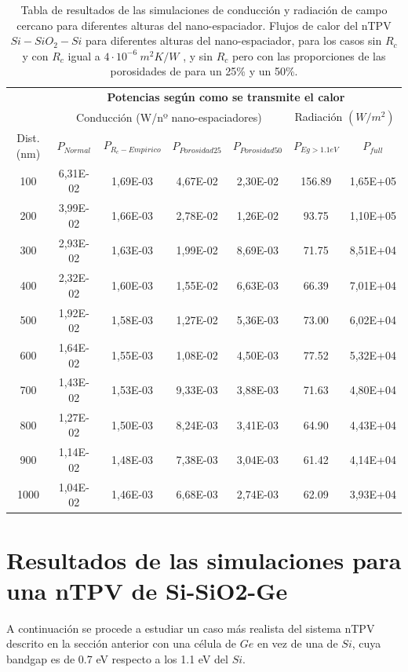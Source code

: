 \begin{table}[H]
	\centering
		\begin{tabular}{|c||c|c|c|c||c|c|}
		\hline
			\multirow{2}{*}{ }& \multicolumn{6}{c|}{\textbf{\large Potencias según como se transmite el calor}}\\ \cline{2-7}
		  & \multicolumn{4}{c||}{Conducción (W/nº nano-espaciadores)}& \multicolumn{2}{c|}{Radiación $(W/m^2)$}\\ \hline
			Dist. (nm)&$P_{Normal}$&$P_{R_c-Empirico}$&$P_{Porosidad25}$&$P_{Porosidad50}$&$P_{Eg>1.1eV}$&$P_{full}$\\ \hline \hline
			100&6,31E-02&1,69E-03&4,67E-02&2,30E-02&156.89&1,65E+05\\ \hline
			200&3,99E-02&1,66E-03&2,78E-02&1,26E-02&93.75&1,10E+05\\ \hline
			300&2,93E-02&1,63E-03&1,99E-02&8,69E-03&71.75&8,51E+04\\ \hline
			400&2,32E-02&1,60E-03&1,55E-02&6,63E-03&66.39&7,01E+04\\ \hline
			500&1,92E-02&1,58E-03&1,27E-02&5,36E-03&73.00&6,02E+04\\ \hline
			600&1,64E-02&1,55E-03&1,08E-02&4,50E-03&77.52&5,32E+04\\ \hline
			700&1,43E-02&1,53E-03&9,33E-03&3,88E-03&71.63&4,80E+04\\ \hline
			800&1,27E-02&1,50E-03&8,24E-03&3,41E-03&64.90&4,43E+04\\ \hline
			900&1,14E-02&1,48E-03&7,38E-03&3,04E-03&61.42&4,14E+04\\ \hline
		 1000&1,04E-02&1,46E-03&6,68E-03&2,74E-03&62.09&3,93E+04\\ \hline
		\end{tabular}
	\caption{Tabla de resultados de las simulaciones de conducción y radiación de campo cercano para diferentes alturas del nano-espaciador. Flujos de calor del nTPV $Si-SiO_2-Si$ para diferentes alturas del nano-espaciador, para los casos sin $R_c$ y con $R_c$ igual a $4 \cdot 10^{-6} \ m^2 K/W$ \cite{nf_TPV_Pillars_SiO2}, y sin $R_c$ pero con las proporciones de las porosidades de \cite{ThermalConductivity_SiO2_2018} para un 25\% y un 50\%.}
	\label{tab:condTerSiSiO2Si}
\end{table}
\vfill \newpage
\section{Resultados de las simulaciones para una nTPV de Si-SiO2-Ge}\label{sec:res_SiSiO2Ge}
A continuación se procede a estudiar un caso más realista del sistema nTPV descrito en la sección anterior con una célula de $Ge$ en vez de una de $Si$, cuya bandgap es de 0.7 eV respecto a los 1.1 eV del $Si$.
